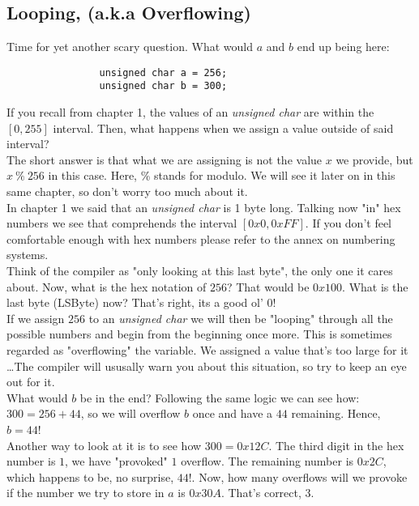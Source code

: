 \documentclass[12pt]{book}
\begin{document}
            \subsection{Looping, (a.k.a Overflowing)}

            Time for yet another scary question. What would $a$ and $b$ end up being here:

            \begin{verbatim}
                unsigned char a = 256;
                unsigned char b = 300;
            \end{verbatim}

            If you recall from chapter 1, the values of an \textit{unsigned char} are within the $[0, 255]$ interval. Then, what happens when we assign a value outside of said interval? \\

            The short answer is that what we are assigning is not the value $x$ we provide, but $x\ \% \ 256$ in this case. Here, \% stands for modulo. We will see it later on in this same chapter, so don't worry too much about it. \\

            In chapter 1 we said that an \textit{unsigned char} is 1 byte long. Talking now "in" hex numbers we see that comprehends the interval $[0x0, 0xFF]$. If you don't feel comfortable enough with hex numbers please refer to the annex on numbering systems. \\

            Think of the compiler as "only looking at this last byte", the only one it cares about. Now, what is the hex notation of $256$? That would be $0x100$. What is the last byte (LSByte) now? That's right, its a good ol' $0$! \\

            If we assign $256$ to an \textit{unsigned char} we will then be "looping" through all the possible numbers and begin from the beginning once more. This is sometimes regarded as "overflowing" the variable. We assigned a value that's too large for it \dots The compiler will ususally warn you about this situation, so try to keep an eye out for it. \\

            What would $b$ be in the end? Following the same logic we can see how: $300 = 256 + 44$, so we will overflow $b$ once and have a $44$ remaining. Hence, $b = 44$! \\

            Another way to look at it is to see how $300 = 0x12C$. The third digit in the hex number is $1$, we have "provoked" $1$ overflow. The remaining number is $0x2C$, which happens to be, no surprise, $44$!. Now, how many overflows will we provoke if the number we try to store in $a$ is $0x30A$. That's correct, $3$. \\
\end{document}
